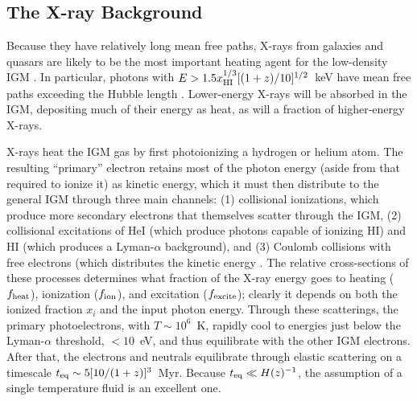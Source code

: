 \documentclass[a4paper,openany, 12pt]{book}
\begin{document}
\subsection{The X-ray Background} 

Because they have relatively long mean free paths, X-rays from galaxies and quasars are likely to be the most important heating agent for the low-density IGM  \cite{madau97}.  In particular, photons with $E>1.5 x_{\rm HI}^{1/3} [(1+z)/10]^{1/2}$~keV have mean free paths exceeding the Hubble length \cite{oh01}.  Lower-energy X-rays will be absorbed in the IGM, depositing much of their energy as heat, as will a fraction of higher-energy X-rays.

X-rays heat the IGM gas by first photoionizing a hydrogen or helium atom.  The resulting ``primary'' electron retains most of the photon energy (aside from that required to ionize it) as kinetic energy, which it must then distribute to the general IGM through three main channels: (1) collisional ionizations, which produce more secondary electrons that themselves scatter through the IGM, (2) collisional excitations of HeI (which produce photons capable of ionizing HI) and HI (which produces a Lyman-$\alpha$ background), and (3) Coulomb collisions with free electrons (which distributes the kinetic energy .  The relative cross-sections of these processes determines what fraction of the X-ray energy goes to heating ($f_{\rm heat}$), ionization ($f_{\rm ion}$), and excitation ($f_{\rm excite}$); clearly it depends on both the ionized fraction $x_i$ and the input photon energy.  Through these scatterings, the primary photoelectrons, with $T \sim 10^6$~K, rapidly cool to energies just below the Lyman-$\alpha$ threshold, $<10$~eV, and thus equilibrate with the other IGM electrons.  After that, the electrons and neutrals equilibrate through elastic scattering on a timescale $t_{\rm eq} \sim 5 [10/(1+z)]^3$~Myr.  Because $t_{\rm eq} \ll H(z)^{-1}$, the assumption of a single temperature fluid is an excellent one.
\end{document}
